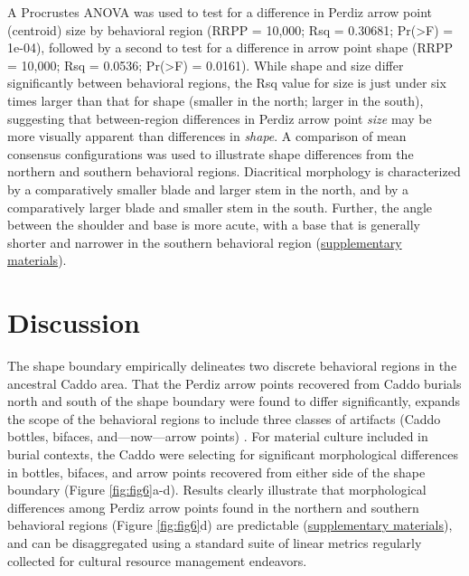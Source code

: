 \documentclass[smallextended]{svjour3}       %
\begin{document}
A Procrustes ANOVA was used to test for a difference in Perdiz arrow
point (centroid) size by behavioral region (RRPP = 10,000; Rsq =
0.30681; Pr(\textgreater F) = 1e-04), followed by a second to test for a
difference in arrow point shape (RRPP = 10,000; Rsq = 0.0536;
Pr(\textgreater F) = 0.0161). While shape and size differ significantly
between behavioral regions, the Rsq value for size is just under six
times larger than that for shape (smaller in the north; larger in the
south), suggesting that between-region differences in Perdiz arrow point
\emph{size} may be more visually apparent than differences in
\emph{shape}. A comparison of mean consensus configurations was used to
illustrate shape differences from the northern and southern behavioral
regions. Diacritical morphology is characterized by a comparatively
smaller blade and larger stem in the north, and by a comparatively
larger blade and smaller stem in the south. Further, the angle between
the shoulder and base is more acute, with a base that is generally
shorter and narrower in the southern behavioral region
(\href{https://seldenlab.github.io/perdiz3/}{supplementary materials}).

\hypertarget{discussion}{%
\section{Discussion}\label{discussion}}

The shape boundary empirically delineates two discrete behavioral
regions in the ancestral Caddo area. That the Perdiz arrow points
recovered from Caddo burials north and south of the shape boundary were
found to differ significantly, expands the scope of the behavioral
regions to include three classes of artifacts (Caddo bottles, bifaces,
and---now---arrow points)
\cite{RN8074,RN7927,RN8370,RN8312,RN8322,RN8158,RN11097}. For material
culture included in burial contexts, the Caddo were selecting for
significant morphological differences in bottles, bifaces, and arrow
points recovered from either side of the shape boundary (Figure
\ref{fig:fig6}a-d). Results clearly illustrate that morphological
differences among Perdiz arrow points found in the northern and southern
behavioral regions (Figure \ref{fig:fig6}d) are predictable
(\href{https://seldenlab.github.io/perdiz3/}{supplementary materials}),
and can be disaggregated using a standard suite of linear metrics
regularly collected for cultural resource management endeavors.
\end{document}
